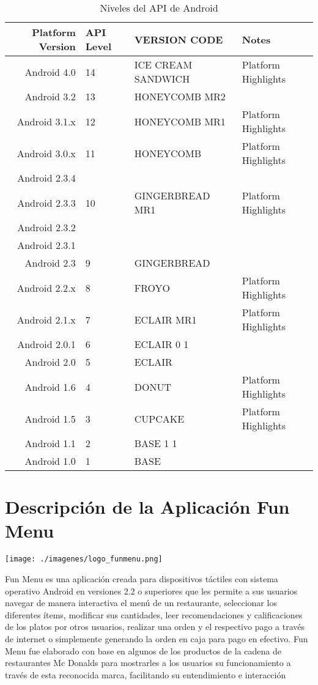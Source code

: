 \documentclass[letterpaper,12pt]{book}
\begin{document}
\begin{mainmatter}
\begin{table}[t]
    \begin{tabular}{ | r | l | l | l |}
    \hline
    \textbf{Platform Version} & \textbf{API Level} & \textbf{VERSION CODE} & \textbf{Notes} \\ \hline
    Android 4.0 & 14 & ICE CREAM SANDWICH &Platform Highlights\\ \hline
Android 3.2 & 13 & HONEYCOMB MR2 & \\ \hline
Android 3.1.x & 12 & HONEYCOMB MR1 & Platform Highlights\\ \hline
Android 3.0.x & 11 & HONEYCOMB & Platform Highlights\\ \hline
Android 2.3.4 & & & \\
Android 2.3.3  & 10 &  GINGERBREAD MR1 & Platform Highlights \\ \cline{2-2}
\hline
Android 2.3.2 & & & \\
Android 2.3.1 & & & \\ 
Android 2.3 & 9 & GINGERBREAD & \\ \cline{3-2}
\hline
Android 2.2.x & 8 & FROYO & Platform Highlights \\ \hline
Android 2.1.x & 7 & ECLAIR MR1 & Platform Highlights \\ \hline
Android 2.0.1 & 6 & ECLAIR 0 1 &\\ \hline
Android 2.0 & 5 & ECLAIR &\\ \hline
Android 1.6 & 4 & DONUT & Platform Highlights \\ \hline
Android 1.5 & 3 & CUPCAKE & Platform Highlights \\ \hline
Android 1.1 & 2 & BASE 1 1 &\\ \hline
Android 1.0 & 1 & BASE & \\ \hline
    \end{tabular}

\caption{Niveles del API de Android \cite{API}}  \label{cap:NivelApi}
\end{table} 


\chapter{Descripción de la Aplicación Fun Menu}

\begin{center}
 \texttt{[image: ./imagenes/logo\_funmenu.png]}
\end{center}

Fun  Menu es  una  aplicación creada  para  dispositivos táctiles  con
sistema  operativo  Android en  versiones  2.2  o  superiores que  les
permite a  sus usuarios  navegar de manera  interactiva el menú  de un
restaurante,   seleccionar  los   diferentes   ítems,  modificar   sus
cantidades, leer  recomendaciones y  calificaciones de los  platos por
otros usuarios,  realizar una orden y  el respectivo pago  a través de
internet  o  simplemente generando  la  orden  en  caja para  pago  en
efectivo. Fun Menu fue elaborado  con base en algunos de los productos
de la cadena de restaurantes Mc Donalds para mostrarles a los usuarios
su funcionamiento  a través de  esta reconocida marca,  facilitando su
entendimiento e interacción


\end{mainmatter}
\end{document}
